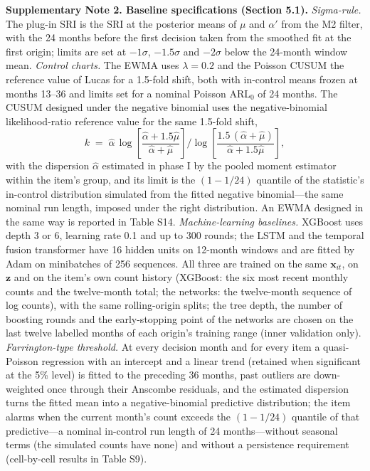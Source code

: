 \textbf{Supplementary Note 2. Baseline specifications (Section 5.1).}
\emph{Sigma-rule.} The plug-in SRI is the SRI at the posterior means of $\mu$ and $\alpha'$ from the M2 filter, with the 24 months before the first decision taken from the smoothed fit at the first origin; limits are set at $-1\sigma$, $-1.5\sigma$ and $-2\sigma$ below the 24-month window mean.
\emph{Control charts.} The EWMA uses $\lambda = 0.2$ and the Poisson CUSUM the reference value of Lucas for a 1.5-fold shift, both with in-control means frozen at months 13--36 and limits set for a nominal Poisson ARL$_0$ of 24 months. The CUSUM designed under the negative binomial uses the negative-binomial likelihood-ratio reference value for the same 1.5-fold shift,
\[
k \;=\; \hat{\alpha}\,\log\!\left[\frac{\hat{\alpha} + 1.5\hat{\mu}}{\hat{\alpha} + \hat{\mu}}\right] \Big/ \log\!\left[\frac{1.5\,(\hat{\alpha} + \hat{\mu})}{\hat{\alpha} + 1.5\hat{\mu}}\right],
\]
with the dispersion $\hat{\alpha}$ estimated in phase I by the pooled moment estimator within the item's group, and its limit is the $(1 - 1/24)$ quantile of the statistic's in-control distribution simulated from the fitted negative binomial---the same nominal run length, imposed under the right distribution. An EWMA designed in the same way is reported in Table S14.
\emph{Machine-learning baselines.} XGBoost uses depth 3 or 6, learning rate 0.1 and up to 300 rounds; the LSTM and the temporal fusion transformer have 16 hidden units on 12-month windows and are fitted by Adam on minibatches of 256 sequences. All three are trained on the same $\mathbf{x}_{it}$, on $\mathbf{z}$ and on the item's own count history (XGBoost: the six most recent monthly counts and the twelve-month total; the networks: the twelve-month sequence of log counts), with the same rolling-origin splits; the tree depth, the number of boosting rounds and the early-stopping point of the networks are chosen on the last twelve labelled months of each origin's training range (inner validation only).
\emph{Farrington-type threshold.} At every decision month and for every item a quasi-Poisson regression with an intercept and a linear trend (retained when significant at the 5\% level) is fitted to the preceding 36 months, past outliers are down-weighted once through their Anscombe residuals, and the estimated dispersion turns the fitted mean into a negative-binomial predictive distribution; the item alarms when the current month's count exceeds the $(1 - 1/24)$ quantile of that predictive---a nominal in-control run length of 24 months---without seasonal terms (the simulated counts have none) and without a persistence requirement (cell-by-cell results in Table S9).

